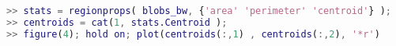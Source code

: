 \begin{lstlisting}[language=matlab]
>> stats = regionprops( blobs_bw, {'area' 'perimeter' 'centroid'} );
>> centroids = cat(1, stats.Centroid );
>> figure(4); hold on; plot(centroids(:,1) , centroids(:,2), '*r')

\end{lstlisting}